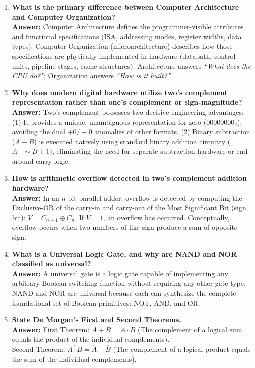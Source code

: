 \begin{enumerate}[label=\bfseries Q\arabic*.]
    \item \textbf{What is the primary difference between Computer Architecture and Computer Organization?} \\
    \textbf{Answer:} Computer Architecture defines the programmer-visible attributes and functional specifications (ISA, addressing modes, register widths, data types). Computer Organization (microarchitecture) describes how those specifications are physically implemented in hardware (datapath, control units, pipeline stages, cache structures). Architecture answers \textit{``What does the CPU do?''}; Organization answers \textit{``How is it built?''}

    \item \textbf{Why does modern digital hardware utilize two's complement representation rather than one's complement or sign-magnitude?} \\
    \textbf{Answer:} Two's complement possesses two decisive engineering advantages: (1) It provides a unique, unambiguous representation for zero ($00000000_2$), avoiding the dual $+0/-0$ anomalies of other formats. (2) Binary subtraction ($A - B$) is executed natively using standard binary addition circuitry ($A + \sim B + 1$), eliminating the need for separate subtraction hardware or end-around carry logic.

    \item \textbf{How is arithmetic overflow detected in two's complement addition hardware?} \\
    \textbf{Answer:} In an $n$-bit parallel adder, overflow is detected by computing the Exclusive-OR of the carry-in and carry-out of the Most Significant Bit (sign bit): $V = C_{n-1} \oplus C_n$. If $V = 1$, an overflow has occurred. Conceptually, overflow occurs when two numbers of like sign produce a sum of opposite sign.

    \item \textbf{What is a Universal Logic Gate, and why are NAND and NOR classified as universal?} \\
    \textbf{Answer:} A universal gate is a logic gate capable of implementing any arbitrary Boolean switching function without requiring any other gate type. NAND and NOR are universal because each can synthesize the complete foundational set of Boolean primitives: NOT, AND, and OR.

    \item \textbf{State De Morgan's First and Second Theorems.} \\
    \textbf{Answer:}
    First Theorem: $\overline{A + B} = \overline{A} \cdot \overline{B}$ (The complement of a logical sum equals the product of the individual complements). \\
    Second Theorem: $\overline{A \cdot B} = \overline{A} + \overline{B}$ (The complement of a logical product equals the sum of the individual complements).


\end{enumerate}
